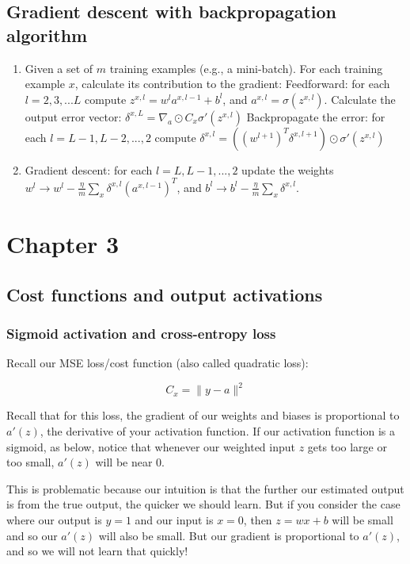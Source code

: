 \documentclass[12pt]{article}
\begin{document}
\subsection*{Gradient descent with backpropagation algorithm}

\begin{enumerate}
\item Given a set of $m$ training examples (e.g., a mini-batch). For each training example $x$, calculate its contribution to the gradient:
\subitem Feedforward: for each $l = 2, 3, ... L$ compute $z^{x,l}= w^l a^{x,l-1} + b^l$, and $a^{x,l} = \sigma(z^{x,l})$.
\subitem Calculate the output error vector: $\delta^{x,L} = \nabla_a \odot C_x \sigma'(z^{x,l})$
\subitem Backpropagate the error: for each $l = L-1, L-2, ..., 2$ compute $\delta^{x,l} = ((w^{l+1})^T\delta^{x,l+1})\odot \sigma'(z^{x,l})$
\item Gradient descent: for each $l = L, L-1, ..., 2$ update the weights $w^l \to w^l - \frac{\eta}{m} \sum_x \delta^{x,l}(a^{x,l-1})^T$, and $b^l \to b^l - \frac{\eta}{m} \sum_x \delta^{x,l}$.
\end{enumerate}

\section*{Chapter 3}

\subsection*{Cost functions and output activations}

\subsubsection*{Sigmoid activation and cross-entropy loss}

Recall our MSE loss/cost function (also called quadratic loss):

$$ C_x = \| y - a \|^2 $$

Recall that for this loss, the gradient of our weights and biases is proportional to $a'(z)$, the derivative of your activation function. If our activation function is a sigmoid, as below, notice that whenever our weighted input $z$ gets too large or too small, $a'(z)$ will be near $0$.

This is problematic because our intuition is that the further our estimated output is from the true output, the quicker we should learn. But if you consider the case where our output is $y=1$ and our input is $x=0$, then $z = wx+b$ will be small and so our $a'(z)$ will also be small. But our gradient is proportional to $a'(z)$, and so we will not learn that quickly!
\end{document}
